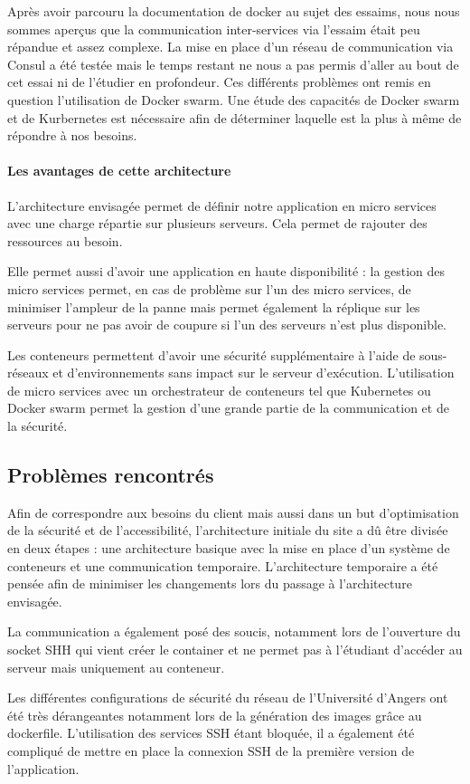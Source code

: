 \par Après avoir parcouru la documentation de docker au sujet des essaims, nous nous sommes aperçus que la communication inter-services via l’\gls{essaim} était peu répandue et assez complexe. La mise en place d’un réseau de communication via Consul a été testée mais le temps restant ne nous a pas permis d’aller au bout de cet essai ni de l’étudier en profondeur. Ces différents problèmes ont remis en question l’utilisation de Docker swarm. Une étude des capacités de Docker swarm et de Kurbernetes est nécessaire afin de déterminer laquelle est la plus à même de répondre à nos besoins.

\paragraph{Les avantages de cette architecture}

\par L'architecture envisagée permet de définir notre application en micro services avec une charge répartie sur plusieurs serveurs. Cela permet de rajouter des ressources au besoin.
\par Elle permet aussi d’avoir une application en haute disponibilité : la gestion des micro services permet, en cas de problème sur l’un des micro services, de minimiser l'ampleur de la panne mais permet également la réplique sur les serveurs pour ne pas avoir de coupure si l’un des serveurs n’est plus disponible.
\par Les conteneurs permettent d’avoir une sécurité supplémentaire à l’aide de sous-réseaux et d’environnements sans impact sur le serveur d’exécution. L’utilisation de micro services avec un orchestrateur de \gls{conteneur}s tel que Kubernetes ou Docker swarm permet la gestion d'une grande partie de la communication et de la sécurité.

\subsection{Problèmes rencontrés}

\par Afin de correspondre aux besoins du client mais aussi dans un but d'optimisation de la sécurité et de l'accessibilité, l’architecture initiale du site a dû être divisée en deux étapes : une architecture basique avec la mise en place d’un système de conteneurs et une communication temporaire. L’architecture temporaire a été pensée afin de minimiser les changements lors du passage à l’architecture envisagée.
\par La communication a également posé des soucis, notamment lors de l’ouverture du socket SHH qui vient créer le container et ne permet pas à l’étudiant d'accéder au serveur mais uniquement au conteneur.

\par Les différentes configurations de sécurité du réseau de l’Université d’Angers ont été très dérangeantes notamment lors de la génération des images grâce au \gls{dockerfile}. L’utilisation des services SSH étant bloquée, il a également été compliqué de mettre en place la connexion SSH de la première version de l’application.
